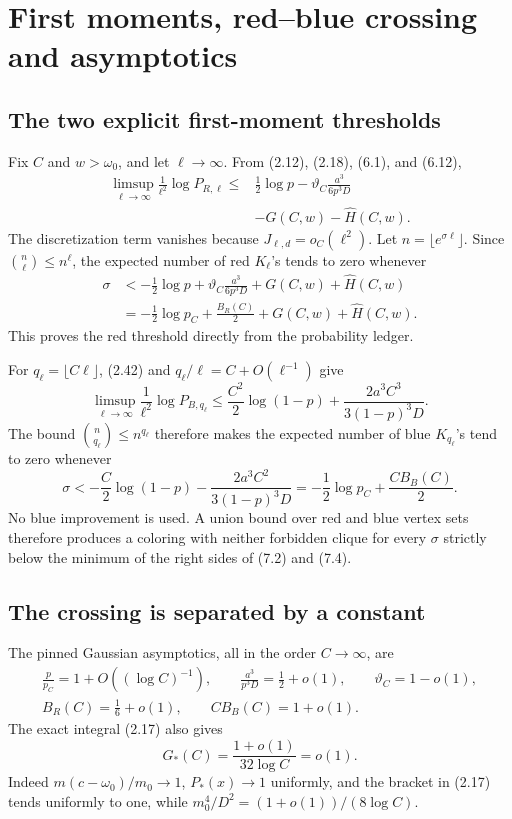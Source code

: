 \section{First moments, red--blue crossing and asymptotics}
\label{sec:rate-lower}

\subsection{The two explicit first-moment thresholds}

Fix \(C\) and \(w>\omega_0\), and let \(\ell\to\infty\).  From (2.12),
(2.18), (6.1), and (6.12),
\[
\begin{aligned}
\limsup_{\ell\to\infty}\frac1{\ell^2}\log P_{R,\ell}
\le{}&\frac12\log p-\vartheta_C\frac{a^3}{6p^3D}\\
&-G(C,w)-\widehat H(C,w).
\end{aligned}
\tag{7.1}
\]
The discretization term vanishes because \(J_{\ell,d}=o_C(\ell^2)\).
Let \(n=\lfloor e^{\sigma\ell}\rfloor\).  Since
\(\binom n\ell\le n^\ell\), the expected number of red
\(K_\ell\)'s tends to zero whenever
\[
\begin{aligned}
\sigma
&<-\frac12\log p+\vartheta_C\frac{a^3}{6p^3D}
+G(C,w)+\widehat H(C,w)\\
&=-\frac12\log p_C+\frac{B_R(C)}2
+G(C,w)+\widehat H(C,w).
\end{aligned}
\tag{7.2}
\]
This proves the red threshold directly from the probability ledger.

For \(q_\ell=\lfloor C\ell\rfloor\), (2.42) and
\(q_\ell/\ell=C+O(\ell^{-1})\) give
\[
 \limsup_{\ell\to\infty}\frac1{\ell^2}\log P_{B,q_\ell}
 \le\frac{C^2}{2}\log(1-p)
 +\frac{2a^3C^3}{3(1-p)^3D}.
\tag{7.3}
\]
The bound \(\binom n{q_\ell}\le n^{q_\ell}\) therefore makes the expected
number of blue \(K_{q_\ell}\)'s tend to zero whenever
\[
 \sigma<-\frac C2\log(1-p)
 -\frac{2a^3C^2}{3(1-p)^3D}
 =-\frac12\log p_C+\frac{CB_B(C)}2.
\tag{7.4}
\]
No blue improvement is used.  A union bound over red and blue vertex sets
therefore produces a coloring with neither forbidden clique for every
\(\sigma\) strictly below the minimum of the right sides of (7.2) and
(7.4).

\subsection{The crossing is separated by a constant}

The pinned Gaussian asymptotics, all in the order \(C\to\infty\), are
\[
\begin{gathered}
 \frac p{p_C}=1+O((\log C)^{-1}),\qquad
 \frac{a^3}{p^3D}=\frac12+o(1),\qquad
 \vartheta_C=1-o(1),\\
 B_R(C)=\frac16+o(1),\qquad CB_B(C)=1+o(1).
\end{gathered}
\tag{7.5}
\]
The exact integral (2.17) also gives
\[
 G_*(C)=\frac{1+o(1)}{32\log C}=o(1).
\tag{7.6}
\]
Indeed \(m(c-\omega_0)/m_0\to1\), \(P_*(x)\to1\) uniformly, and the
bracket in (2.17) tends uniformly to one, while
\(m_0^4/D^2=(1+o(1))/(8\log C)\).

